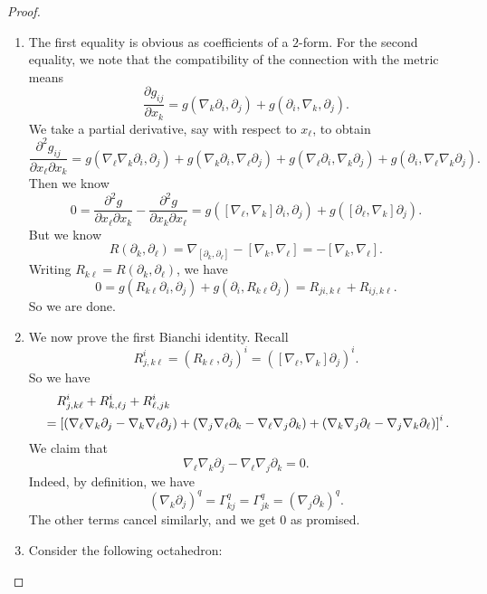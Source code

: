 \documentclass[a4paper]{article}
\begin{document}
\begin{proof}\leavevmode
  \begin{enumerate}
    \item The first equality is obvious as coefficients of a $2$-form. For the second equality, we note that the compatibility of the connection with the metric means
      \[
        \frac{\partial g_{ij}}{\partial x_k} = g(\nabla_k \partial_i, \partial_j) + g(\partial_i, \nabla_k, \partial_j).
      \]
      We take a partial derivative, say with respect to $x_\ell$, to obtain
      \[
        \frac{\partial^2 g_{ij}}{\partial x_\ell \partial x_k} = g(\nabla_\ell \nabla_k \partial_i, \partial_j) + g(\nabla_k \partial_i, \nabla_\ell \partial_j) + g(\nabla_\ell \partial_i, \nabla_k \partial_j) + g(\partial_i, \nabla_\ell \nabla_k \partial_j).
      \]
      Then we know
      \[
        0 = \frac{\partial^2 g}{\partial x_\ell \partial x_k} - \frac{\partial^2 g}{\partial x_k \partial x_\ell} = g([\nabla_\ell, \nabla_k] \partial_i, \partial_j) + g([\partial_\ell, \nabla_k]\partial_j).
      \]
      But we know
      \[
        R(\partial_k, \partial_\ell) = \nabla_{[\partial_k, \partial_\ell]} - [\nabla_k, \nabla_\ell] = -[\nabla_k, \nabla_\ell].
      \]
      Writing $R_{k\ell} = R(\partial_k, \partial_\ell)$, we have
      \[
        0 = g(R_{k\ell} \partial_i, \partial_j) + g(\partial_i, R_{k\ell} \partial_j) = R_{ji, k\ell} + R_{ij, k\ell}.
      \]
      So we are done.
    \item We now prove the first Bianchi identity. Recall
      \[
        R^i_{j, k\ell} = (R_{k\ell}, \partial_j)^i = ([\nabla_\ell, \nabla_k] \partial_j)^i.
      \]
      So we have
      \begin{align*}
        &\hphantom{={}}R^i_{j, k\ell} + R^i_{k, \ell j} + R^i_{\ell, jk}\\
        &= \left[(\nabla_\ell \nabla_k \partial_j - \nabla_k \nabla_\ell \partial_j) + (\nabla_j \nabla_\ell \partial_k - \nabla_\ell \nabla_j \partial_k) + (\nabla_k \nabla_j \partial_\ell - \nabla_j \nabla_k \partial_\ell)\right]^i.
      \end{align*}
      We claim that
      \[
        \nabla_\ell \nabla_k \partial_j - \nabla_\ell \nabla_j \partial_k = 0.
      \]
      Indeed, by definition, we have
      \[
        (\nabla_k \partial_j)^q = \Gamma_{kj}^q = \Gamma_{jk}^q = (\nabla_j \partial_k)^q.
      \]
      The other terms cancel similarly, and we get $0$ as promised.
    \item Consider the following octahedron:
      \begin{center}
\end{center}
\end{enumerate}
\end{proof}
\end{document}
